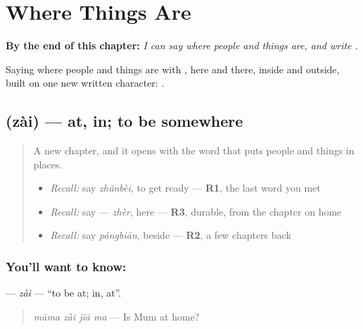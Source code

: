 
\chapter{Where Things Are}
\label{ch:zh-where-things-are}

\begin{chapteropening}
\textbf{By the end of this chapter:} \emph{I can say where people and things are, and write .}

Saying where people and things are with , here and there, inside and outside, built on one new written character: .
\end{chapteropening}

\section[\texorpdfstring{\zh{在} (zài)}{在 (zài)}]{ (zài) — at, in; to be somewhere}

\label{lesson:ZH-C85-zai}



\begin{quote}
A new chapter, and it opens with the word that puts people and things in places.

\begin{itemize}
\raggedright
  \item \emph{Recall:} say \emph{zhǔnbèi}, to get ready — \textbf{R1}, the last word you met
  \item \emph{Recall:} say  — \emph{zhèr}, here — \textbf{R3}, durable, from the chapter on home
  \item \emph{Recall:} say \emph{pángbiān}, beside — \textbf{R2}, a few chapters back
\end{itemize}
\end{quote}

\subsection*{You'll want to know: }
\textbf{} — \emph{zài} — \textquotedblleft{}to be at; in, at\textquotedblright{}.

\begin{quote}
\textbf{} \emph{māma zài jiā ma} — Is Mum at home?
\end{quote}

